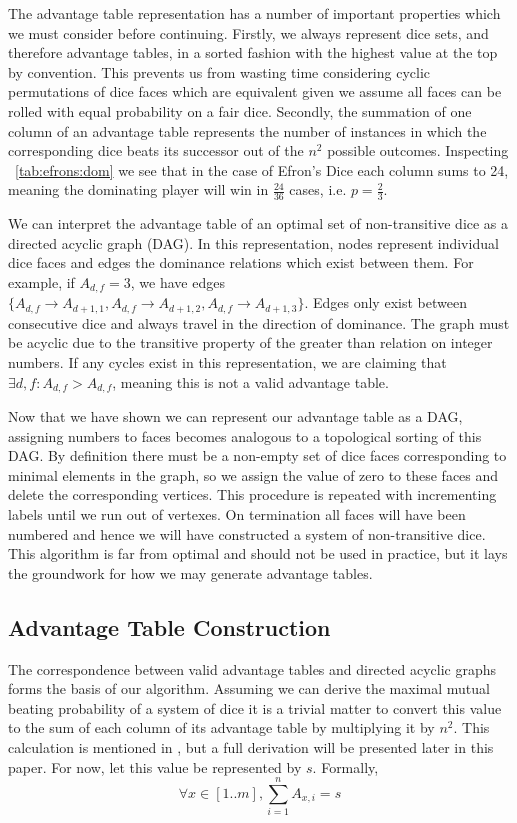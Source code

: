 \documentclass[a4paper,twocolumn]{article}
\begin{document}
The advantage table representation has a number of important properties which we must consider before continuing. Firstly, we always represent dice sets, and therefore advantage tables, in a sorted fashion with the highest value at the top by convention. This prevents us from wasting time considering cyclic permutations of dice faces which are equivalent given we assume all faces can be rolled with equal probability on a fair dice. Secondly, the summation of one column of an advantage table represents the number of instances in which the corresponding dice beats its successor out of the $n^2$ possible outcomes. Inspecting \tablename~\ref{tab:efrons:dom} we see that in the case of Efron's Dice each column sums to 24, meaning the dominating player will win in $\frac{24}{36}$ cases, i.e. $p=\frac{2}{3}$.

We can interpret the advantage table of an optimal set of non-transitive dice as a directed acyclic graph (DAG). In this representation, nodes represent individual dice faces and edges the dominance relations which exist between them. For example, if $A_{d,f}=3$, we have edges $\lbrace A_{d,f} \rightarrow A_{d+1, 1},A_{d,f} \rightarrow A_{d+1, 2},A_{d,f} \rightarrow A_{d+1, 3}\rbrace$. Edges only exist between consecutive dice and always travel in the direction of dominance. The graph must be acyclic due to the transitive property of the greater than relation on integer numbers. If any cycles exist in this representation, we are claiming that $\exists d,f :  A_{d,f} >  A_{d,f}$, meaning this is not a valid advantage table.

Now that we have shown we can represent our advantage table as a DAG, assigning numbers to faces becomes analogous to a topological sorting of this DAG. By definition there must be a non-empty set of dice faces corresponding to minimal elements in the graph, so we assign the value of zero to these faces and delete the corresponding vertices. This procedure is repeated with incrementing labels until we run out of vertexes. On termination all faces will have been numbered and hence we will have constructed a system of non-transitive dice. This algorithm is far from optimal and should not be used in practice, but it lays the groundwork for how we may generate advantage tables.

\subsection*{Advantage Table Construction}

The correspondence between valid advantage tables and directed acyclic graphs forms the basis of our algorithm. Assuming we can derive the maximal mutual beating probability of a system of dice it is a trivial matter to convert this value to the sum of each column of its advantage table by multiplying it by $n^2$. This calculation is mentioned in \cite{tenney1976non}, but a full derivation will be presented later in this paper. For now, let this value be represented by $s$. Formally, 
\begin{equation}
\forall x \in [1..m], \sum\limits_{i=1}^n A_{x,i} = s
\end{equation} 
\end{document}
